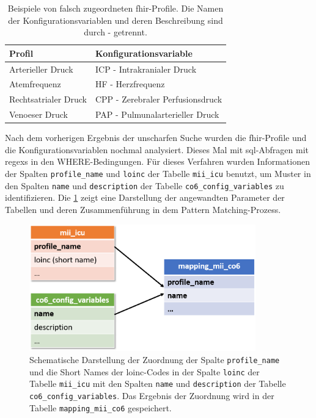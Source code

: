 \begin{table}[ht]
	\centering 
	\caption[Beispiele von falsch zugeordneten \acs{fhir}-Profile]{Beispiele von falsch zugeordneten \acs{fhir}-Profile. Die Namen der Konfigurationsvariablen und deren Beschreibung sind durch \glqq-\grqq{} getrennt.}
	\label{tab:wrongpaar}
	\begin{tabular}{|l|l|}
		\hline
		\bfseries Profil & \bfseries Konfigurationsvariable \\ \hline
		Arterieller Druck & ICP - Intrakranialer Druck \\ \hline
		Atemfrequenz & HF - Herzfrequenz \\ \hline
        Rechtsatrialer Druck & CPP - Zerebraler Perfusionsdruck \\ \hline
        Venoeser Druck & PAP - Pulmunalarterieller Druck \\ \hline
	\end{tabular}
\end{table}

Nach dem vorherigen Ergebnis der unscharfen Suche wurden die \ac{fhir}-Profile und die Konfigurationsvariablen nochmal analysiert. Dieses Mal mit \ac{sql}-Abfragen mit \acp{regex} in den WHERE-Bedingungen. Für dieses Verfahren wurden Informationen der Spalten \texttt{profile\_name} und \texttt{loinc} der Tabelle \texttt{mii\_icu} benutzt, um Muster in den Spalten \texttt{name} und \texttt{description} der Tabelle \texttt{co6\_config\_variables} zu identifizieren. Die \ref{fig:mapping} zeigt eine Darstellung der angewandten Parameter der Tabellen und deren Zusammenführung in dem Pattern Matching-Prozess.

\clearpage

\begin{figure}[ht]
	\centering
	\includegraphics[height=5.5cm]{figures/mapping}
	\caption[Zuordnung der Konfigurationsvariablen mit den \acs{fhir}-Profilen]{Schematische Darstellung der Zuordnung der Spalte \texttt{profile\_name} und die \glqq Short Names\grqq{} der \acs{loinc}-Codes in der Spalte \texttt{loinc} der Tabelle \texttt{mii\_icu} mit den Spalten \texttt{name} und \texttt{description} der Tabelle \texttt{co6\_config\_variables}. Das Ergebnis der Zuordnung wird in der Tabelle \texttt{mapping\_mii\_co6} gespeichert.}
	\label{fig:mapping}
\end{figure}


